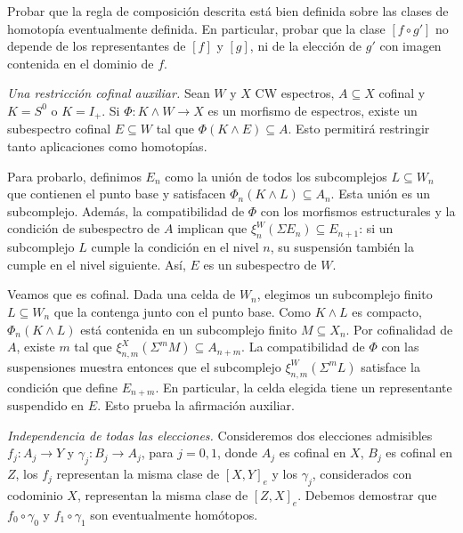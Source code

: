\begin{ejer}\label{ejer:c11-composicion-eventual}
Probar que la regla de composición descrita está bien definida sobre las clases de homotopía eventualmente definida. En particular, probar que la clase $[f\circ g']$ no depende de los representantes de $[f]$ y $[g]$, ni de la elección de $g'$ con imagen contenida en el dominio de $f$.
\end{ejer}
\begin{sol}
\emph{Una restricción cofinal auxiliar.} Sean $W$ y $X$ CW espectros, $A\subseteq X$ cofinal y $K=S^0$ o $K=I_+$. Si $\Phi\colon K\wedge W\to X$ es un morfismo de espectros, existe un subespectro cofinal $E\subseteq W$ tal que $\Phi(K\wedge E)\subseteq A$. Esto permitirá restringir tanto aplicaciones como homotopías.

Para probarlo, definimos $E_n$ como la unión de todos los subcomplejos $L\subseteq W_n$ que contienen el punto base y satisfacen $\Phi_n(K\wedge L)\subseteq A_n$. Esta unión es un subcomplejo. Además, la compatibilidad de $\Phi$ con los morfismos estructurales y la condición de subespectro de $A$ implican que $\xi^W_n(\Sigma E_n)\subseteq E_{n+1}$: si un subcomplejo $L$ cumple la condición en el nivel $n$, su suspensión también la cumple en el nivel siguiente. Así, $E$ es un subespectro de $W$.

Veamos que es cofinal. Dada una celda de $W_n$, elegimos un subcomplejo finito $L\subseteq W_n$ que la contenga junto con el punto base. Como $K\wedge L$ es compacto, $\Phi_n(K\wedge L)$ está contenida en un subcomplejo finito $M\subseteq X_n$. Por cofinalidad de $A$, existe $m$ tal que $\xi^X_{n,m}(\Sigma^mM)\subseteq A_{n+m}$. La compatibilidad de $\Phi$ con las suspensiones muestra entonces que el subcomplejo $\xi^W_{n,m}(\Sigma^mL)$ satisface la condición que define $E_{n+m}$. En particular, la celda elegida tiene un representante suspendido en $E$. Esto prueba la afirmación auxiliar.

\emph{Independencia de todas las elecciones.} Consideremos dos elecciones admisibles $f_j\colon A_j\to Y$ y $\gamma_j\colon B_j\to A_j$, para $j=0,1$, donde $A_j$ es cofinal en $X$, $B_j$ es cofinal en $Z$, los $f_j$ representan la misma clase de $[X,Y]_e$ y los $\gamma_j$, considerados con codominio $X$, representan la misma clase de $[Z,X]_e$. Debemos demostrar que $f_0\circ\gamma_0$ y $f_1\circ\gamma_1$ son eventualmente homótopos.


\end{sol}
